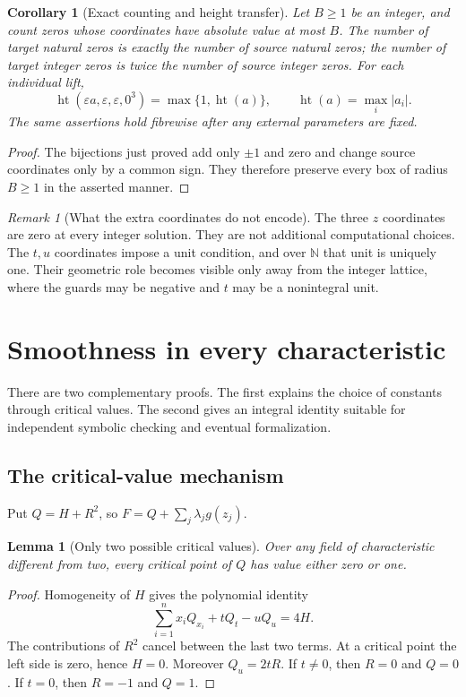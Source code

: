 \documentclass[11pt,a4paper]{article}
\newtheorem{lemma}[theorem]{Lemma}
\newtheorem{corollary}[theorem]{Corollary}
\theoremstyle{definition}
\theoremstyle{remark}
\newtheorem{remark}[theorem]{Remark}
\newcommand{\N}{\mathbb N}
\newcommand{\height}{\operatorname{ht}}
\newcommand{\guard}{g}
\begin{document}
\begin{corollary}[Exact counting and height transfer]\label{sdf:cor:height}
Let $B\ge1$ be an integer, and count zeros whose coordinates have absolute
value at most $B$. The number of target natural zeros is exactly the number
of source natural zeros; the number of target integer zeros is twice the
number of source integer zeros. For each individual lift,
\[
 \height(\varepsilon a,\varepsilon,\varepsilon,0^3)
       =\max\{1,\height(a)\},\qquad
 \height(a)=\max_i|a_i|.
\]
The same assertions hold fibrewise after any external parameters are fixed.
\end{corollary}
\begin{proof}
The bijections just proved add only $\pm1$ and zero and change source
coordinates only by a common sign. They therefore preserve every box of
radius $B\ge1$ in the asserted manner.
\end{proof}

\begin{remark}[What the extra coordinates do not encode]
The three $z$ coordinates are zero at every integer solution. They are not
additional computational choices. The $t,u$ coordinates impose a unit
condition, and over $\N$ that unit is uniquely one. Their geometric role
becomes visible only away from the integer lattice, where the guards may
be negative and $t$ may be a nonintegral unit.
\end{remark}

\section{Smoothness in every characteristic}\label{sdf:sec:smooth}

There are two complementary proofs. The first explains the choice of
constants through critical values. The second gives an integral identity
suitable for independent symbolic checking and eventual formalization.

\subsection{The critical-value mechanism}

Put $Q=H+R^2$, so $F=Q+\sum_j\lambda_j\guard(z_j)$.

\begin{lemma}[Only two possible critical values]\label{sdf:lem:critical}
Over any field of characteristic different from two, every critical point
of $Q$ has value either zero or one.
\end{lemma}
\begin{proof}
Homogeneity of $H$ gives the polynomial identity
\begin{equation}\label{sdf:eq:Euler}
 \sum_{i=1}^n x_iQ_{x_i}+tQ_t-uQ_u=4H.
\end{equation}
The contributions of $R^2$ cancel between the last two terms. At a critical
point the left side is zero, hence $H=0$. Moreover $Q_u=2tR$.
If $t\ne0$, then $R=0$ and $Q=0$. If $t=0$, then $R=-1$ and $Q=1$.
\end{proof}
\end{document}
